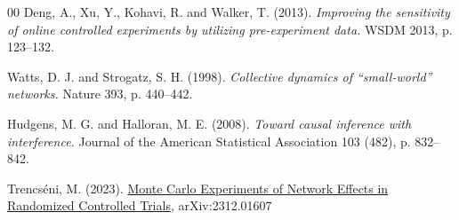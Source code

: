 \documentclass[final,5p,times,twocolumn,authoryear]{elsarticle}
\begin{document}
\begin{thebibliography}{00}
 Deng, A., Xu, Y., Kohavi, R. and Walker, T. (2013). \textit{Improving the sensitivity of online controlled experiments by utilizing pre-experiment data.} WSDM 2013, p. 123–132.

 Watts, D. J. and Strogatz, S. H. (1998). \textit{Collective dynamics of ``small-world'' networks.} Nature 393, p. 440–442.

 Hudgens, M. G. and Halloran, M. E. (2008). \textit{Toward causal inference with interference.} Journal of the American Statistical Association 103 (482), p. 832–842.

 Trencséni, M. (2023). \href{https://arxiv.org/abs/2312.01607}{Monte Carlo Experiments of Network Effects in Randomized Controlled Trials}, arXiv:2312.01607

\end{thebibliography}

%  








\end{document}
